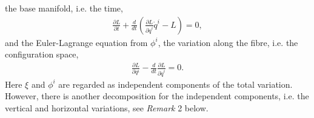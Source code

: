 \documentclass[a4paper,a4paper]{article}
\begin{document}
the base manifold, i.e. the time,
\begin{align}
\frac{\partial L}{\partial t}+\frac{d}{dt}\left(
           \frac{\partial L}{\partial \dot{q}^i}\dot{q}^i-L\right)=0,
\label{2.12}
\end{align}
 and
the Euler-Lagrange equation from $\phi^i$, the %
 variation along the fibre, i.e. the configuration space,
\begin{align}
 \frac{\partial L}{\partial q^i}-\frac{d}{dt}
          \frac{\partial L}{\partial \dot{q}^i}=0. \label{2.13}
\end{align}
\noindent Here $\xi$ and $\phi^i$  are %
regarded as independent components of
the total variation. However, there is another decomposition for
the independent components, i.e. the %
vertical and
horizontal variations, see {\em Remark} 2 below.
\end{document}

